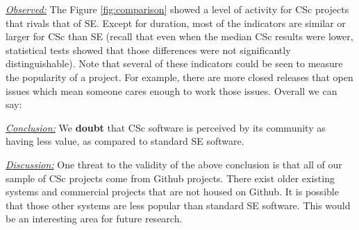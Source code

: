 \documentclass[conference,10pt]{IEEEtran}
\newenvironment{RQ}{\vspace{1mm}\begin{tcolorbox}[enhanced,width=3.4in,size=fbox,colback=red!5!white,drop shadow southeast,sharp corners]}{\end{tcolorbox}}
\begin{document}
\noindent \textit{\underline{Observed:}} 
The Figure \ref{fig:comparison} showed a
level of activity for CSc projects that rivals that of SE.
Except for duration, most of the indicators are similar or larger for CSc than SE
(recall that even when the median CSc results were lower, statistical tests showed that those differences
were not significantly distinguishable). Note that several of these indicators could be seen
to measure the popularity of a project. For example,
there are more closed releases that open issues which mean someone cares enough to work those issues.
Overall we can say:


\begin{RQ}
\textit{\underline{Conclusion:}} 
We  \textbf{doubt} that CSc software is perceived by its community as having less value,
as compared to standard SE software.
\end{RQ}

\noindent \textit{\underline{Discussion:}} 
One threat to the validity of the above conclusion is that all of our sample of CSc projects come from Github projects.
 There exist older existing systems and commercial projects that are not housed on Github. It is possible that those other systems are less popular than standard SE software. This would be an interesting area for future research.
  
  


\end{document}
